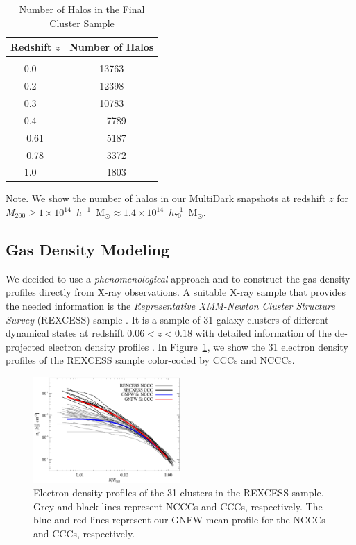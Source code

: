 \documentclass[traditabstract]{aa}
\begin{document}
\begin{table}[t]
\begin{center}
\caption{Number of Halos in the Final Cluster Sample}
\medskip
\begin{tabular}{cc}
\hline
\phantom{\Big|}
Redshift $z$ & Number of Halos \\
\hline\\[-0.5em]
 0.0~~ &  13763\\
 0.2~~ &  12398\\
 0.3~~ &  10783\\ 
 0.4~~ &   ~~7789\\ 
 0.61  &  ~~5187\\ 
 0.78  &  ~~3372\\ 
 1.0~~ &  ~~1803\\[0.5em]
\hline
\end{tabular}
\label{tab:z}
\end{center}
\footnotesize{Note. We show the number of halos in our MultiDark snapshots at redshift $z$ for $M_{200}\geq1\times10^{14}$~$h^{-1}$~M$_{\odot}\approx1.4\times10^{14}$~$h_{70}^{-1}$~M$_{\odot}$. }
\end{table}


\subsection{Gas Density Modeling}
\label{sec:2.2}

We decided to use a \emph{phenomenological} approach and to construct the gas
density profiles directly from X-ray observations. A suitable X-ray sample that
provides the needed information is the \emph{Representative XMM-Newton Cluster
  Structure Survey} (REXCESS) sample \citep{2008A&A...487..431C,
  2009A&A...498..361P}. It is a sample of 31 galaxy clusters of different
dynamical states at redshift $0.06<z<0.18$ with detailed information of the
de-projected electron density profiles \citep{2008A&A...487..431C}. In
Figure~\ref{fig:gas_profiles}, we show the 31 electron density profiles of the
REXCESS sample color-coded by CCCs and NCCCs.

\begin{figure}[t]
\centering
\includegraphics[width=0.5\textwidth]{figures/gas_profiles.eps}
\caption{Electron density profiles of the 31 clusters in the REXCESS sample. Grey and black lines represent NCCCs and CCCs, respectively. The blue and red lines represent our GNFW mean profile for the NCCCs and CCCs, respectively.}
\label{fig:gas_profiles}
\end{figure}
\end{document}
